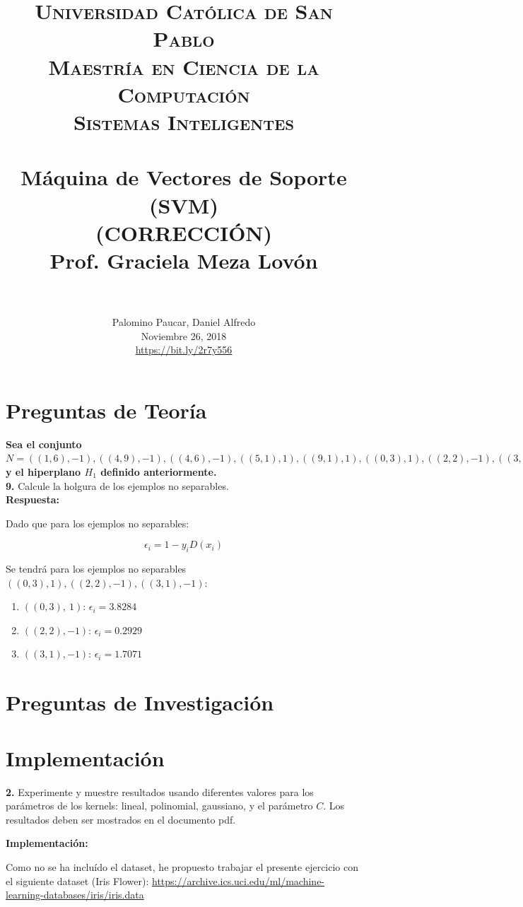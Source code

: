 \documentclass[paper=a4, fontsize=11pt]{scrartcl}
\title{
		\usefont{OT1}{bch}{b}{n}
		\normalfont \normalsize \textsc{Universidad Católica de San Pablo \\
		Maestría en Ciencia de la Computación \\
        Sistemas Inteligentes} \\ [25pt]
		\horrule{0.5pt} \\[0.4cm]
		\huge Máquina de Vectores de Soporte (SVM) \\
		(CORRECCIÓN)\\
        Prof. Graciela Meza Lovón \\
		\horrule{2pt} \\[0.5cm]
}
\author{
		\normalfont 								\normalsize
        Palomino Paucar, Daniel Alfredo\\[-3pt]		\normalsize
        Noviembre 26, 2018 \\
        \url{https://bit.ly/2r7y556}
}
\date{}
\numberwithin{equation}{section}		%
\numberwithin{figure}{section}			%
\numberwithin{table}{section}				%
\begin{document}
\maketitle

\newpage
\section{Preguntas de Teoría}
    

\textbf{Sea el conjunto $N = {((1,6),-1), ((4,9),-1), ((4,6),-1), ((5,1),1), ((9,1),1), ((0,3),1), ((2,2),-1), ((3,1),-1)}$ y el hiperplano $H_1$ definido anteriormente.}\\
    

    
\textbf{9.} Calcule la holgura de los ejemplos no separables.\\
    
    \textbf{Respuesta:}
    
    Dado que para los ejemplos no separables:
    
    $$\epsilon_i=1-y_{i}D(x_i)$$
    
    Se tendrá para los ejemplos no separables ${((0,3),1), ((2,2),-1), ((3,1),-1)}$:
    
    \begin{enumerate}
        \item $((0,3),\ 1)$: $\epsilon_i = 3.8284$
        \item $((2,2),-1)$: $\epsilon_i = 0.2929$
        \item $((3,1),-1)$: $\epsilon_i = 1.7071$
    \end{enumerate}

\newpage
\section{Preguntas de Investigación}

\section{Implementación}

\textbf{2.} Experimente y muestre resultados usando diferentes valores para los parámetros de los kernels: lineal, polinomial, gaussiano, y el parámetro $C$. Los resultados deben ser mostrados en el documento pdf.
    
    \textbf{Implementación:}
    
    Como no se ha incluído el dataset, he propuesto trabajar el presente ejercicio con el siguiente dataset (Iris Flower): \url{https://archive.ics.uci.edu/ml/machine-learning-databases/iris/iris.data}\\
    
\end{document}
